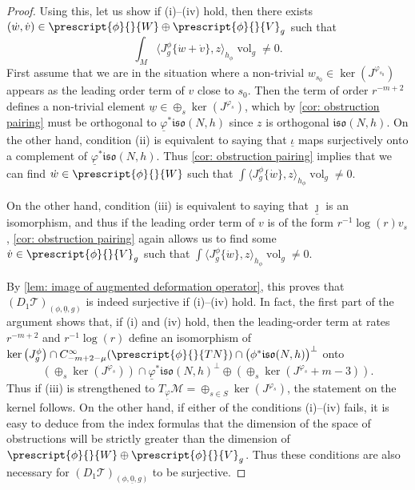 \documentclass{article}
\numberwithin{equation}{section}        %
\theoremstyle{bfnote}
\theoremstyle{definition}
\theoremstyle{bfremark}
\DeclareMathOperator{\vol}{vol}                 %
\begin{document}
\begin{proof}
    Using this, let us show if (i)--(iv) hold, then there exists $(\dot w,\dot v) \in \prescript{\phi}{}{W} \oplus \prescript{\phi}{}{V}_g$ such that
    \begin{equation*}
        \int_M \big\langle J^{\phi}_g\{\dot w + \dot v\}, z  \big\rangle_{h_\phi} \vol_{g} \neq 0.
    \end{equation*}
    First assume that we are in the situation where a non-trivial $w_{s_0} \in \ker(J^{\varphi_{s_0}})$ appears as the leading order term of $v$ close to $s_0$. Then the term of order $r^{-m+2}$ defines a non-trivial element $\underline{w} \in \oplus_s \ker(J^{\varphi_s})$, which by \cref{cor: obstruction pairing} must be orthogonal to $\underline{\varphi}^*\mathfrak{iso}(N,h)$ since $z$ is orthogonal $\mathfrak{iso}(N,h)$. On the other hand, condition (ii) is equivalent to saying that $\underline{\iota}$ maps surjectively onto a complement of $\underline{\varphi}^*\mathfrak{iso}(N,h)$. Thus \cref{cor: obstruction pairing} implies that we can find $\dot w \in \prescript{\phi}{}{W}$ such that $\int \langle J^\phi_g \{\dot w\}, z \rangle_{h_\phi} \vol_g \neq 0$.
    
    On the other hand, condition (iii) is equivalent to saying that $\underline{\jmath}$ is an isomorphism, and thus if the leading order term of $v$ is of the form $r^{-1}\log(r) v_s$, \cref{cor: obstruction pairing} again allows us to find some $\dot v\in \prescript{\phi}{}{V}_g$ such that $\int \langle J^\phi_g \{\dot w\}, z \rangle_{h_\phi} \vol_g \neq 0$.

    By \cref{lem: image of augmented deformation operator}, this proves that $(D_1 \mathcal{T})_{(\phi,\underline{0},g)}$ is indeed surjective if (i)--(iv) hold. In fact, the first part of the argument shows that, if (i) and (iv) hold, then the leading-order term at rates $r^{-m+2}$ and $r^{-1}\log(r)$ define an isomorphism of $\ker\big(J^{\phi}_g \big) \cap C^\infty_{-m+2-\mu}(\prescript{\phi}{}{TN}) \cap \big(\phi^*\mathfrak{iso}(N,h)\big)^{\perp}$ onto 
    \begin{equation*}
        (\oplus_s \ker(J^{\varphi_s})) \cap \underline{\varphi}^*\mathfrak{iso}(N,h)^\perp \oplus (\oplus_s \ker(J^{\varphi_s}+m-3)).
    \end{equation*}
    Thus if (iii) is strengthened to $T_{\underline{\varphi}} \mathcal{M} = \oplus_{s \in S} \ker(J^{\varphi_s})$, the statement on the kernel follows. On the other hand, if either of the conditions (i)--(iv) fails, it is easy to deduce from the index formulas that the dimension of the space of obstructions will be strictly greater than the dimension of $\prescript{\phi}{}{W} \oplus \prescript{\phi}{}{V}_g$. Thus these conditions are also necessary for $(D_1 \mathcal{T})_{(\phi,\underline{0},g)}$ to be surjective.
\end{proof}
\end{document}

